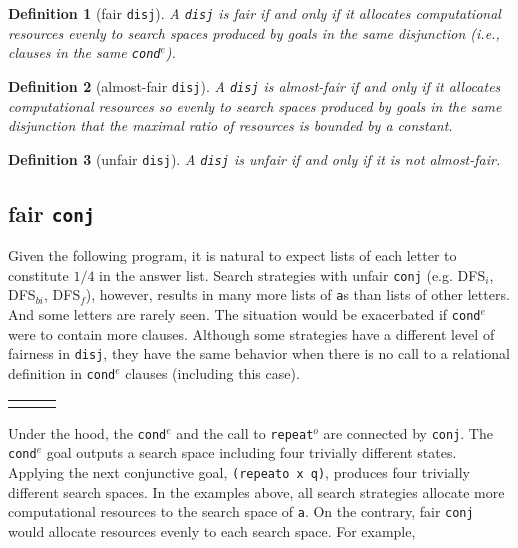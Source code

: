 \documentclass[format=acmlarge, review=true, authordraft=true]{acmart}
\newcommand{\conde}{\texttt{cond$^e$}}
\newcommand{\conj}{\texttt{conj}}
\newcommand{\disj}{\texttt{disj}}
\newcommand{\repeato}{\texttt{repeat$^o$}}
\newcommand{\DFSi }[0]{DFS$_{i}$}
\newcommand{\DFSf }[0]{DFS$_{f}$}
\newcommand{\DFSbi}[0]{DFS$_{bi}$}
\newtheorem{defn}{Definition}[section]
\begin{document}
\begin{defn}[fair \disj{}]
A \disj{} is fair if and only if it allocates computational resources evenly to 
search spaces produced by goals in the same disjunction 
(i.e., clauses in the same \conde).
\end{defn}

\begin{defn}[almost-fair \disj{}]
A \disj{} is almost-fair if and only if it allocates computational resources
so evenly to search spaces produced by goals in the same disjunction that 
the maximal ratio of resources is bounded by a constant.
\end{defn}

\begin{defn}[unfair \disj{}]
A \disj{} is unfair if and only if it is not almost-fair.
\end{defn}

\subsection{fair \texttt{conj}}
\label{sec:fairconj}

Given the following program, it is natural to expect lists of each letter to
constitute $1/4$ in the answer list. Search strategies with unfair \conj{} 
(e.g. 
\DFSi, \DFSbi, \DFSf), however, results in many more lists of \texttt{a}s than 
lists of other letters. And some letters are rarely seen. The situation would 
be exacerbated if \conde{} were to contain more clauses.
Although some strategies have a different level of fairness in \disj{}, they 
have the same behavior when there is no call to a relational definition in 
\conde{} clauses (including this case).

\begin{center}
\begin{tabular}{l|c|r}
     &
     &
     \\
\end{tabular}
\end{center}

Under the hood, the \conde{} and the call to \repeato{} are connected by 
\conj{}. The \conde{} goal outputs a search space including four trivially 
different states. 
Applying the next conjunctive goal, \texttt{(repeato x q)}, produces four 
trivially different search spaces.
In the examples above, all search strategies allocate more computational 
resources to the search space of \texttt{a}. On the contrary, fair \conj{} 
would allocate resources evenly to each search space. For example,
\end{document}
